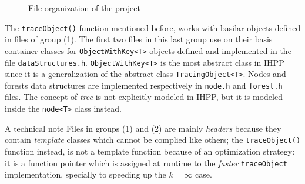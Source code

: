 \documentclass[a4paper,10pt]{report}
\begin{document}
\begin{figure}[H]


\caption{File organization of the project}
\label{proj_files}

\end{figure}

\noindent 
The \verb|traceObject()| function mentioned before, works with basilar objects 
defined in files of group (1). The first two files in this last group use on their basis
container classes for \verb|ObjectWithKey<T>| objects defined and implemented 
in the file \verb|dataStructures.h|.
\verb|ObjectWithKey<T>| is the most abstract class in IHPP since it is a generalization of the abstract class \verb|TracingObject<T>|. 
Nodes and forests data structures are implemented respectively in \verb|node.h| and \verb|forest.h| files. The concept of \emph{tree} is not explicitly modeled in IHPP, but it is 
modeled inside the \verb|node<T>| class instead. 
\begin{paragraph}{A technical note}
Files in groups (1) and (2) 
are mainly \emph{headers} because they
contain \emph{template} classes which cannot be complied like others; 
the \verb|traceObject()| function instead, is not a template function because of 
an optimization strategy: it is a function pointer which is assigned at runtime
to the \emph{faster} \verb|traceObject| implementation, specially to speeding up 
the $k=\infty$ case. 
\end{paragraph}
\end{document}

